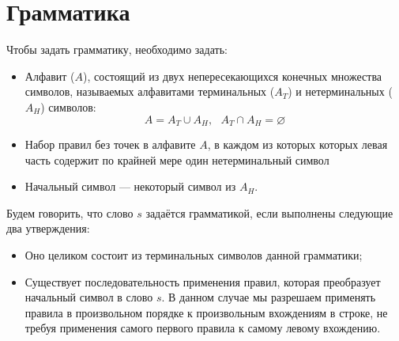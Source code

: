 \documentclass[12pt,a4paper,oneside]{article}
\begin{document}
%
%
%
%
\section{Грамматика}

\begin{definition}
Чтобы задать грамматику, необходимо задать:
\begin{itemize}
\item Алфавит ($A$), состоящий из двух непересекающихся конечных 
множества символов, называемых 
алфавитами терминальных ($A_T$) и нетерминальных ($A_H$) символов:
$$A = A_T \cup A_H, ~~~ A_T \cap A_H = \varnothing$$
\item Набор правил без точек в алфавите $A$, в каждом из которых которых левая часть 
содержит по крайней мере один нетерминальный символ
\item Начальный символ --- некоторый символ из $A_H$.
\end{itemize}
\end{definition} 

\begin{definition}
Будем говорить, что слово $s$ задаётся грамматикой, если выполнены следующие два утверждения:
\begin{itemize}
\item Оно целиком состоит из терминальных символов данной грамматики;
\item Существует последовательность применения правил, которая преобразует
начальный символ в слово $s$. В данном случае мы разрешаем применять правила
в произвольном порядке к произвольным вхождениям в строке, не требуя применения 
самого первого правила к самому левому вхождению.
\end{itemize}
\end{definition}
\end{document}
